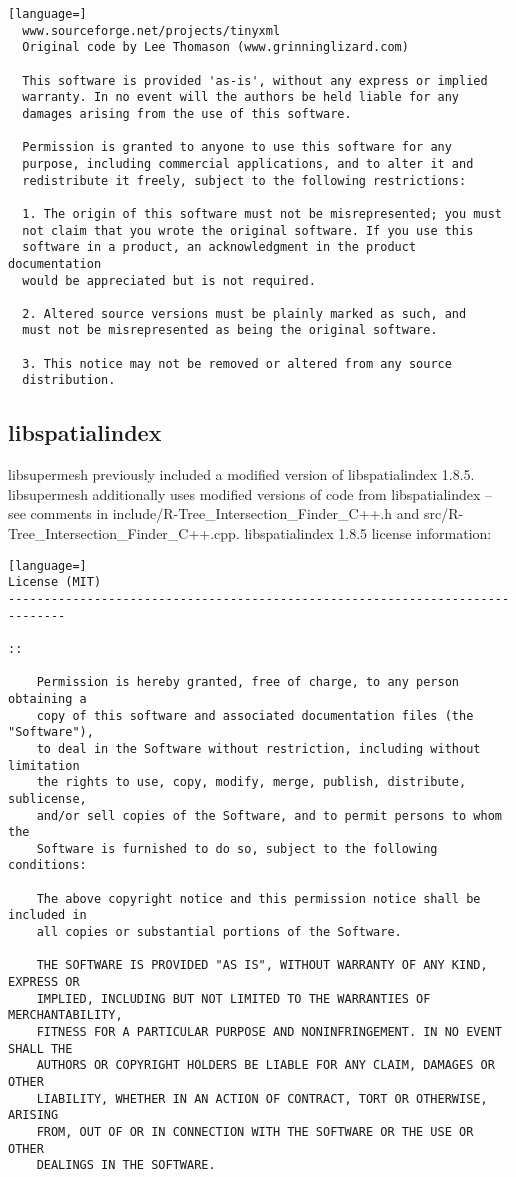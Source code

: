 \documentclass{article}
\begin{document}
\begin{lstlisting}[language=]
  www.sourceforge.net/projects/tinyxml
  Original code by Lee Thomason (www.grinninglizard.com)

  This software is provided 'as-is', without any express or implied
  warranty. In no event will the authors be held liable for any
  damages arising from the use of this software.

  Permission is granted to anyone to use this software for any
  purpose, including commercial applications, and to alter it and
  redistribute it freely, subject to the following restrictions:

  1. The origin of this software must not be misrepresented; you must
  not claim that you wrote the original software. If you use this
  software in a product, an acknowledgment in the product documentation
  would be appreciated but is not required.

  2. Altered source versions must be plainly marked as such, and
  must not be misrepresented as being the original software.

  3. This notice may not be removed or altered from any source
  distribution.
\end{lstlisting}

\subsection{libspatialindex}

libsupermesh previously included a modified version of libspatialindex 1.8.5.
libsupermesh additionally uses modified versions of code from libspatialindex --
see comments in include/R-Tree\_Intersection\_Finder\_C++.h and
src/R-Tree\_Intersection\_Finder\_C++.cpp. libspatialindex 1.8.5 license
information:

\begin{lstlisting}[language=]
License (MIT)
------------------------------------------------------------------------------

::

    Permission is hereby granted, free of charge, to any person obtaining a
    copy of this software and associated documentation files (the "Software"),
    to deal in the Software without restriction, including without limitation
    the rights to use, copy, modify, merge, publish, distribute, sublicense,
    and/or sell copies of the Software, and to permit persons to whom the
    Software is furnished to do so, subject to the following conditions:

    The above copyright notice and this permission notice shall be included in
    all copies or substantial portions of the Software.

    THE SOFTWARE IS PROVIDED "AS IS", WITHOUT WARRANTY OF ANY KIND, EXPRESS OR
    IMPLIED, INCLUDING BUT NOT LIMITED TO THE WARRANTIES OF MERCHANTABILITY,
    FITNESS FOR A PARTICULAR PURPOSE AND NONINFRINGEMENT. IN NO EVENT SHALL THE
    AUTHORS OR COPYRIGHT HOLDERS BE LIABLE FOR ANY CLAIM, DAMAGES OR OTHER
    LIABILITY, WHETHER IN AN ACTION OF CONTRACT, TORT OR OTHERWISE, ARISING
    FROM, OUT OF OR IN CONNECTION WITH THE SOFTWARE OR THE USE OR OTHER
    DEALINGS IN THE SOFTWARE.
\end{lstlisting}
\end{document}
